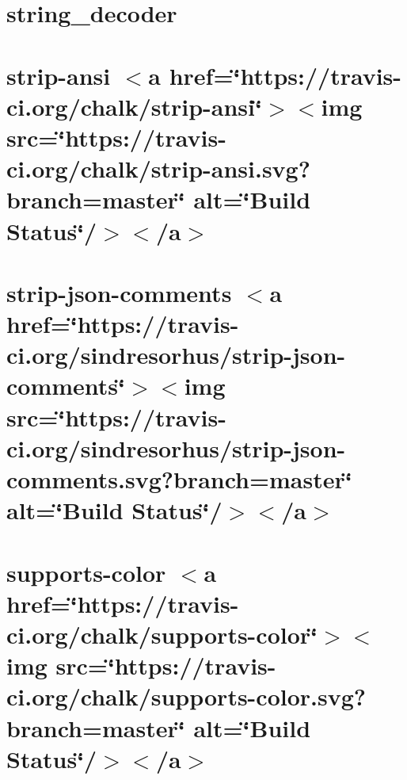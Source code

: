 \let\mypdfximage\pdfximage\def\pdfximage{\immediate\mypdfximage}\documentclass[twoside]{book}
\newcommand{\+}{\discretionary{\mbox{\scriptsize$\hookleftarrow$}}{}{}}
\begin{document}
\chapter{string\+\_\+decoder}
\label{md__c_1__git_hub__p_r_o_y_e_c_t_o-_i_i_i-_g_o_t_rest-api_node_modules_string_decoder__r_e_a_d_m_e}

\chapter{strip-\/ansi $<$a href=\char`\"{}https\+://travis-\/ci.\+org/chalk/strip-\/ansi\char`\"{}$>$$<$img src=\char`\"{}https\+://travis-\/ci.\+org/chalk/strip-\/ansi.\+svg?branch=master\char`\"{} alt=\char`\"{}\+Build Status\char`\"{}/$>$$<$/a$>$}
\label{md__c_1__git_hub__p_r_o_y_e_c_t_o-_i_i_i-_g_o_t_rest-api_node_modules_strip-ansi_readme}

\chapter{strip-\/json-\/comments $<$a href=\char`\"{}https\+://travis-\/ci.\+org/sindresorhus/strip-\/json-\/comments\char`\"{}$>$$<$img src=\char`\"{}https\+://travis-\/ci.\+org/sindresorhus/strip-\/json-\/comments.\+svg?branch=master\char`\"{} alt=\char`\"{}\+Build Status\char`\"{}/$>$$<$/a$>$}
\label{md__c_1__git_hub__p_r_o_y_e_c_t_o-_i_i_i-_g_o_t_rest-api_node_modules_strip-json-comments_readme}

\chapter{supports-\/color $<$a href=\char`\"{}https\+://travis-\/ci.\+org/chalk/supports-\/color\char`\"{}$>$$<$img src=\char`\"{}https\+://travis-\/ci.\+org/chalk/supports-\/color.\+svg?branch=master\char`\"{} alt=\char`\"{}\+Build Status\char`\"{}/$>$$<$/a$>$}
\label{md__c_1__git_hub__p_r_o_y_e_c_t_o-_i_i_i-_g_o_t_rest-api_node_modules_supports-color_readme}

\end{document}
